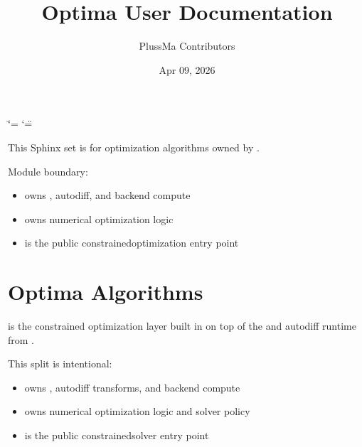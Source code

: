 \documentclass[letterpaper,10pt,english]{sphinxmanual}
\title{Optima User Documentation}
\date{Apr 09, 2026}
\author{PlussMa Contributors}
\begin{document}
\ifdefined\shorthandoff
  \ifnum\catcode`\=\string=\active\shorthandoff{=}\fi
  \ifnum\catcode`\"=\active{}\fi
\fi

\pagestyle{empty}
\sphinxmaketitle
\pagestyle{plain}
\sphinxtableofcontents
\pagestyle{normal}
\label{\detokenize{index::doc}}


\sphinxAtStartPar
This Sphinx set is for optimization algorithms owned by .

\sphinxAtStartPar
Module boundary:
\begin{itemize}
\item {} 
\sphinxAtStartPar
{} owns , autodiff, and backend compute

\item {} 
\sphinxAtStartPar
{} owns numerical optimization logic

\item {} 
\sphinxAtStartPar
{} is the public constrained\sphinxhyphen{}optimization entry point

\end{itemize}

\sphinxstepscope


\chapter{Optima Algorithms}
\label{\detokenize{optima_algorithms:optima-algorithms}}\label{\detokenize{optima_algorithms::doc}}
\sphinxAtStartPar
{} is the constrained optimization layer built in  on top of the  and autodiff runtime from .

\sphinxAtStartPar
This split is intentional:
\begin{itemize}
\item {} 
\sphinxAtStartPar
{} owns , autodiff transforms, and backend compute

\item {} 
\sphinxAtStartPar
{} owns numerical optimization logic and solver policy

\item {} 
\sphinxAtStartPar
{} is the public constrained\sphinxhyphen{}solver entry point

\end{itemize}
\end{document}
